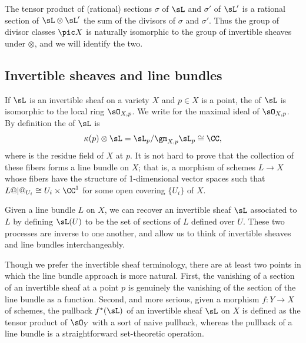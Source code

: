 The tensor product of (rational) sections $\sigma$ of $\sL$ and $\sigma'$
of $\sL'$ is a rational section of $\sL \otimes \sL'$ 
the sum of the divisors of $\sigma$ and 
$\sigma'$. Thus the group of divisor classes $\pic X$ is naturally isomorphic to the group of invertible
sheaves under $\otimes$, and we will identify the two.

\subsection*{Invertible sheaves and line bundles}

If $\sL$ is an invertible sheaf on a variety $X$ and $p\in X$ is a point, the 
%
%
%
of $\sL$ is isomorphic to the local
ring $\sO_{X,p}$. We write 
for the maximal ideal of $\sO_{X,p}$. By definition the 
%
of $\sL$ is 
$$
\kappa(p) \otimes \sL =\sL_p/\gm_{X,p}\sL_p\cong \CC
,
$$
where 
%
is the residue field of $X$ at $p$.
It is not hard to prove that the collection of these fibers forms a line bundle on $X$; that is,
%
a morphism of schemes $L \to X$ whose fibers have the structure of 1-dimensional vector spaces
such that $L@|@_{U_{i}} \cong U_{i}\times \CC^{1}$ for some open covering $\{U_{i}\}$ of $X$.

Given a line bundle $L$ on $X$, 
we can recover an invertible sheaf $\sL$ associated to $L$ by defining
$\sL(U)$ to be the set of sections of $L$ defined over $U$. These two processes are inverse to one another, and allow
us to think of invertible sheaves and line bundles interchangeably.

Though we 
prefer the invertible sheaf terminology, there are at least two points
in which the line bundle approach is more natural. First,  the
vanishing of a section of an invertible sheaf at a point $p$ is
genuinely the vanishing of the
section of the line bundle as a function. Second, and more serious, given a morphism $f: Y\to X$ of schemes, the 
%
%
pullback $f^*(\sL)$ of an invertible sheaf $\sL$ on $X$ is defined as
the tensor product of $\sO_Y$ with a sort of naive pullback, whereas
the pullback of a line bundle is a straightforward set-theoretic
operation.

